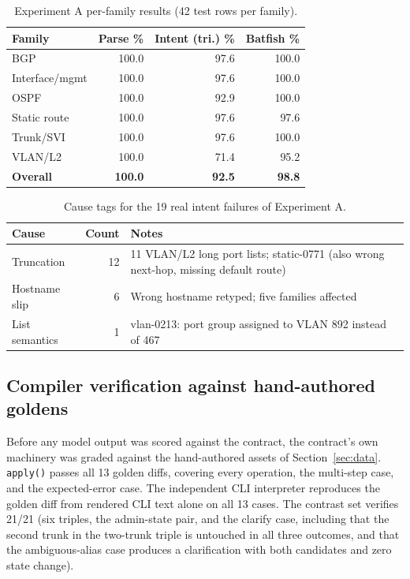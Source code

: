 \documentclass[conference]{IEEEtran}
\begin{document}
\begin{table}[t]
\centering
\caption{Experiment A per-family results (42 test rows per family).}
\label{tab:perfamily}
\small
\begin{tabular}{@{}lrrr@{}}
\toprule
\textbf{Family} & \textbf{Parse \%} & \textbf{Intent (tri.) \%} & \textbf{Batfish \%} \\
\midrule
BGP & 100.0 & 97.6 & 100.0 \\
Interface/mgmt & 100.0 & 97.6 & 100.0 \\
OSPF & 100.0 & 92.9 & 100.0 \\
Static route & 100.0 & 97.6 & 97.6 \\
Trunk/SVI & 100.0 & 97.6 & 100.0 \\
VLAN/L2 & 100.0 & 71.4 & 95.2 \\
\midrule
\textbf{Overall} & \textbf{100.0} & \textbf{92.5} & \textbf{98.8} \\
\bottomrule
\end{tabular}
\end{table}

\begin{table}[t]
\centering
\caption{Cause tags for the 19 real intent failures of Experiment A.}
\label{tab:causes}
\small
\begin{tabular}{@{}lrp{4.6cm}@{}}
\toprule
\textbf{Cause} & \textbf{Count} & \textbf{Notes} \\
\midrule
Truncation & 12 & 11 VLAN/L2 long port lists; static-0771 (also wrong next-hop, missing default route) \\
Hostname slip & 6 & Wrong hostname retyped; five families affected \\
List semantics & 1 & vlan-0213: port group assigned to VLAN 892 instead of 467 \\
\bottomrule
\end{tabular}
\end{table}

\subsection{Compiler verification against hand-authored goldens}
\label{sec:results-verification}

Before any model output was scored against the contract, the contract's own machinery was graded against the hand-authored assets of Section~\ref{sec:data}. \texttt{apply()} passes all 13 golden diffs, covering every operation, the multi-step case, and the expected-error case. The independent CLI interpreter reproduces the golden diff from rendered CLI text alone on all 13 cases. The contrast set verifies 21/21 (six triples, the admin-state pair, and the clarify case, including that the second trunk in the two-trunk triple is untouched in all three outcomes, and that the ambiguous-alias case produces a clarification with both candidates and zero state change).
\end{document}
